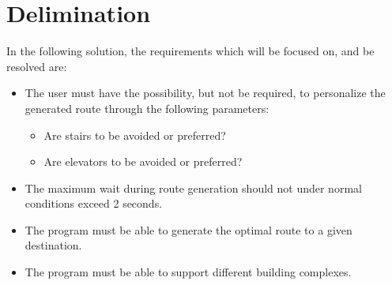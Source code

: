 
\section{Delimination}\label{sec:delimination}

In the following solution, the requirements which will be focused on, and be resolved are:

\begin{itemize}
  \item The user must have the possibility, but not be required, to personalize the generated route through the following parameters:
      \begin{itemize}
        \item Are stairs to be avoided or preferred?
        \item Are elevators to be avoided or preferred?
      \end{itemize}
  \item The maximum wait during route generation should not under normal conditions exceed 2 seconds.

  \item The program must be able to generate the optimal route to a given destination.

  \item The program must be able to support different building complexes.

\end{itemize}


